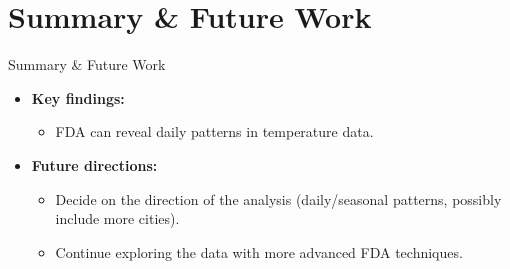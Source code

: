 \documentclass[svgnames, 12pt]{beamer}
\begin{document}
\section{Summary \& Future Work}

\begin{frame}{Summary \& Future Work}
	\begin{itemize}
		\item \textbf{Key findings:}
		\begin{itemize}
			\item FDA can reveal daily patterns in temperature data.
		\end{itemize}
		\item \textbf{Future directions:}
		\begin{itemize}
			\item Decide on the direction of the analysis (daily/seasonal patterns, possibly include more cities).
			\item Continue exploring the data with more advanced FDA techniques.
		\end{itemize}
	\end{itemize}
\end{frame}
\end{document}
